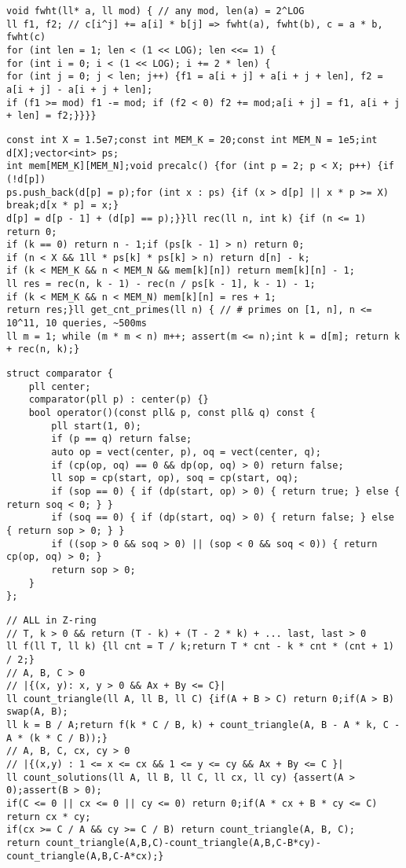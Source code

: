 \documentclass[12pt]{article}
\begin{document}
\begin{verbatim}
void fwht(ll* a, ll mod) { // any mod, len(a) = 2^LOG
ll f1, f2; // c[i^j] += a[i] * b[j] => fwht(a), fwht(b), c = a * b, fwht(c)
for (int len = 1; len < (1 << LOG); len <<= 1) {
for (int i = 0; i < (1 << LOG); i += 2 * len) {
for (int j = 0; j < len; j++) {f1 = a[i + j] + a[i + j + len], f2 = a[i + j] - a[i + j + len];
if (f1 >= mod) f1 -= mod; if (f2 < 0) f2 += mod;a[i + j] = f1, a[i + j + len] = f2;}}}}
\end{verbatim}

\begin{verbatim}
const int X = 1.5e7;const int MEM_K = 20;const int MEM_N = 1e5;int d[X];vector<int> ps;
int mem[MEM_K][MEM_N];void precalc() {for (int p = 2; p < X; p++) {if (!d[p])
ps.push_back(d[p] = p);for (int x : ps) {if (x > d[p] || x * p >= X) break;d[x * p] = x;}
d[p] = d[p - 1] + (d[p] == p);}}ll rec(ll n, int k) {if (n <= 1) return 0;
if (k == 0) return n - 1;if (ps[k - 1] > n) return 0;
if (n < X && 1ll * ps[k] * ps[k] > n) return d[n] - k;
if (k < MEM_K && n < MEM_N && mem[k][n]) return mem[k][n] - 1;
ll res = rec(n, k - 1) - rec(n / ps[k - 1], k - 1) - 1;
if (k < MEM_K && n < MEM_N) mem[k][n] = res + 1;
return res;}ll get_cnt_primes(ll n) { // # primes on [1, n], n <= 10^11, 10 queries, ~500ms
ll m = 1; while (m * m < n) m++; assert(m <= n);int k = d[m]; return k + rec(n, k);}
\end{verbatim}

\begin{verbatim}
struct comparator {
    pll center;
    comparator(pll p) : center(p) {}
    bool operator()(const pll& p, const pll& q) const {
        pll start(1, 0);
        if (p == q) return false;
        auto op = vect(center, p), oq = vect(center, q);
        if (cp(op, oq) == 0 && dp(op, oq) > 0) return false;
        ll sop = cp(start, op), soq = cp(start, oq);
        if (sop == 0) { if (dp(start, op) > 0) { return true; } else { return soq < 0; } }
        if (soq == 0) { if (dp(start, oq) > 0) { return false; } else { return sop > 0; } }
        if ((sop > 0 && soq > 0) || (sop < 0 && soq < 0)) { return cp(op, oq) > 0; }
        return sop > 0;
    }
};
\end{verbatim}

\begin{verbatim}
// ALL in Z-ring
// T, k > 0 && return (T - k) + (T - 2 * k) + ... last, last > 0
ll f(ll T, ll k) {ll cnt = T / k;return T * cnt - k * cnt * (cnt + 1) / 2;}
// A, B, C > 0
// |{(x, y): x, y > 0 && Ax + By <= C}|
ll count_triangle(ll A, ll B, ll C) {if(A + B > C) return 0;if(A > B) swap(A, B);
ll k = B / A;return f(k * C / B, k) + count_triangle(A, B - A * k, C - A * (k * C / B));}
// A, B, C, cx, cy > 0
// |{(x,y) : 1 <= x <= cx && 1 <= y <= cy && Ax + By <= C }|
ll count_solutions(ll A, ll B, ll C, ll cx, ll cy) {assert(A > 0);assert(B > 0);
if(C <= 0 || cx <= 0 || cy <= 0) return 0;if(A * cx + B * cy <= C) return cx * cy;
if(cx >= C / A && cy >= C / B) return count_triangle(A, B, C);
return count_triangle(A,B,C)-count_triangle(A,B,C-B*cy)-count_triangle(A,B,C-A*cx);}
\end{verbatim}
\end{document}
